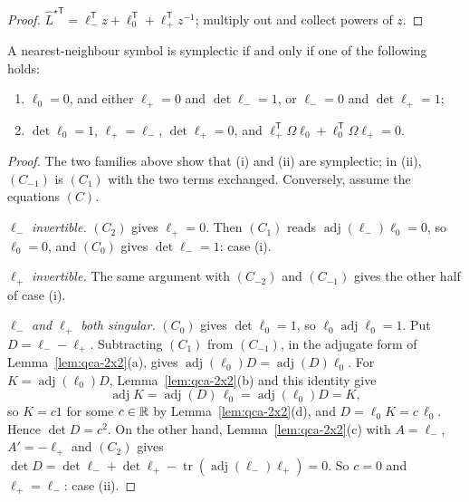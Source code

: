 \begin{proof}
$\hat L^{\star\mathsf T}=\ell_-^{\mathsf T}z+\ell_0^{\mathsf T}+\ell_+^{\mathsf T}z^{-1}$; multiply out
and collect powers of $z$.
\end{proof}

\noindent{}

\begin{proposition}\label{prop:qca-nn}
A nearest-neighbour symbol is symplectic if and only if one of the following holds:
\begin{enumerate}[label=(\roman*)]
\item $\ell_0=0$, and either $\ell_+=0$ and $\det\ell_-=1$, or $\ell_-=0$ and $\det\ell_+=1$;
\item $\det\ell_0=1$, $\ell_+=\ell_-$, $\det\ell_+=0$, and
$\ell_+^{\mathsf T}\Omega\ell_0+\ell_0^{\mathsf T}\Omega\ell_+=0$.
\end{enumerate}
\end{proposition}

\begin{proof}
The two families above show that (i) and (ii) are symplectic; in (ii), $(C_{-1})$ is $(C_1)$ with
the two terms exchanged. Conversely, assume the equations $(C)$.

\emph{$\ell_-$ invertible.} $(C_2)$ gives $\ell_+=0$. Then $(C_1)$ reads
$\operatorname{adj}(\ell_-)\ell_0=0$, so $\ell_0=0$, and $(C_0)$ gives $\det\ell_-=1$: case (i).

\emph{$\ell_+$ invertible.} The same argument with $(C_{-2})$ and $(C_{-1})$ gives the other half
of case (i).

\emph{$\ell_-$ and $\ell_+$ both singular.} $(C_0)$ gives $\det\ell_0=1$, so
$\ell_0\operatorname{adj}\ell_0=1$. Put $D=\ell_--\ell_+$. Subtracting $(C_1)$ from $(C_{-1})$, in
the adjugate form of Lemma~\ref{lem:qca-2x2}(a), gives
$\operatorname{adj}(\ell_0)D=\operatorname{adj}(D)\ell_0$. For $K=\operatorname{adj}(\ell_0)D$,
Lemma~\ref{lem:qca-2x2}(b) and this identity give
\[\operatorname{adj}K=\operatorname{adj}(D)\,\ell_0=\operatorname{adj}(\ell_0)D=K,\]
so $K=c1$ for some $c\in\mathbb R$ by Lemma~\ref{lem:qca-2x2}(d), and $D=\ell_0K=c\,\ell_0$. Hence
$\det D=c^2$. On the other hand, Lemma~\ref{lem:qca-2x2}(c) with $A=\ell_-$, $A'=-\ell_+$ and
$(C_2)$ gives $\det D=\det\ell_-+\det\ell_+-\operatorname{tr}(\operatorname{adj}(\ell_-)\ell_+)=0$.
So $c=0$ and $\ell_+=\ell_-$: case (ii).
\end{proof}

